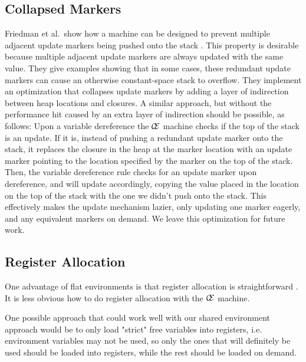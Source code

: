 \subsection{Collapsed Markers}
Friedman et al.\ show how a machine can be designed to prevent multiple adjacent
update markers being pushed onto the stack \cite{lkm}.  This property is
desirable because multiple adjacent update markers are always updated with the
same value. They give examples showing that in some cases, these redundant
update markers can cause an otherwise constant-space stack to overflow.  They
implement an optimization that collapses update markers by adding a layer of
indirection between heap locations and closures. A similar approach,
but without the performance hit caused by an extra layer of indirection should
be possible, as follows: Upon a variable dereference the $\mathcal{\mathcal{C}
\mskip -4mu \mathcal{E}}$ machine checks if the top of the stack is an update.
If it is, instead of pushing a redundant update marker onto the stack, it
replaces the closure in the heap at the marker location with an update marker
pointing to the location specified by the marker on the top of the stack.  Then,
the variable dereference rule checks for an update marker upon dereference, and
will update accordingly, copying the value placed in the location on the top of
the stack with the one we didn't push onto the stack. This effectively makes the
update mechanism lazier, only updating one marker eagerly, and any equivalent
markers on demand. We leave this optimization for future work.

\subsection{Register Allocation} \label{sec:alloc}
One advantage of flat environments is that register allocation is
straightforward \cite{appel1992compiling,jonesstg,terei2010llvm}. It is less
obvious how to do register allocation with the $\mathcal{\mathcal{C} \mskip
-4mu \mathcal{E}}$ machine.  

One possible approach that could work well with our shared environment approach
would be to only load "strict" free variables into registers, i.e. environment
variables may not be used, so only the ones that will definitely be used should
be loaded into registers, while the rest should be loaded on demand. 

